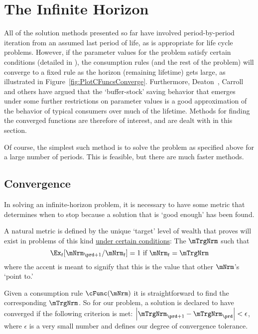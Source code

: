\documentclass[\econtexRoot/SolvingMicroDSOPs]{subfiles}
\begin{document}
\hypertarget{the-infinite-horizon}{}
\section{The Infinite Horizon}\label{sec:the-infinite-horizon}

All of the solution methods presented so far have involved period-by-period iteration from an assumed last period of life, as is appropriate for life cycle problems.  However, if the parameter values for the problem satisfy certain conditions (detailed in \cite{BufferStockTheory}), the consumption rules (and the rest of the problem) will converge to a fixed rule as the horizon (remaining lifetime) gets large, as illustrated in Figure~\ref{fig:PlotCFuncsConverge}.  Furthermore, Deaton~\citeyearpar{deatonLiqConstr}, Carroll~\citeyearpar{carroll:brookings,carrollBSLCPIH} and others have argued that the `buffer-stock' saving behavior that emerges under some further restrictions on parameter values is a good approximation of the behavior of typical consumers over much of the lifetime.  Methods for finding the converged functions are therefore of interest, and are dealt with in this section.

Of course, the simplest such method is to solve the problem as
specified above for a large number of periods.  This is feasible, but
there are much faster methods.

\subsection{Convergence}

In solving an infinite-horizon problem, it is necessary to have some
metric that determines when to stop because a solution that is `good
enough' has been found.

A natural metric is defined by the unique `target' level of wealth that \cite{BufferStockTheory} proves
will exist in problems of this kind \href{https://llorracc.github.io/BufferStockTheory#GICNrm}{under certain conditions}: The $\mTrgNrm$ such that
\begin{equation}
  \Ex_t [{\mNrm}_{\prd+1}/\mNrm_t] = 1 \mbox{~if~} \mNrm_t = \mTrgNrm  \label{eq:mTrgNrmet}
\end{equation}
where the accent is meant to signify that this is the value
that other $\mNrm$'s `point to.'

Given a consumption rule $\cFunc(\mNrm)$ it is straightforward to find
the corresponding $\mTrgNrm$.  So for our problem, a solution is declared
to have converged if the following criterion is met:
$\left|\mTrgNrm_{\prd+1}-\mTrgNrm_{\prd}\right| < \epsilon$, where $\epsilon$ is
a very small number and defines our degree of convergence tolerance.
\end{document}
